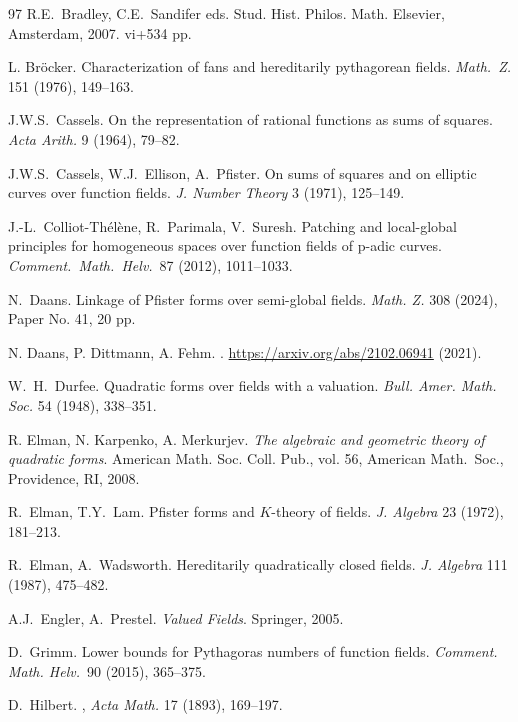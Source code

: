 \documentclass[12pt,leqno]{amsart}
\numberwithin{equation}{section}
\theoremstyle{definition}
\theoremstyle{plain}
\begin{document}
\begin{thebibliography}{97}
R.E.~Bradley, C.E.~Sandifer eds.
Stud. Hist. Philos. Math.
Elsevier, Amsterdam, 2007. vi+534 pp.

L. Br\"ocker.
\newblock Characterization of fans and hereditarily pythagorean fields.
\newblock \emph{Math.~Z.} 151 (1976), 149--163.

J.W.S.~Cassels.
On the representation of rational functions as sums of squares.
{\em Acta Arith.} 9 (1964), 79--82.

J.W.S.~Cassels, W.J.~Ellison, A.~Pfister.
\newblock On sums of squares and on elliptic curves over function fields.
{\em J. Number Theory} 3 (1971), 125--149.

J.-L.~Colliot-Th\'el\`ene, R.~Parimala, V.~Suresh.
\newblock Patching and local-global principles for homogeneous spaces over function fields of p-adic curves.
\emph{Comment.~Math.~Helv.}~87 (2012), 1011--1033. 

N.~Daans. Linkage of Pfister forms over semi-global fields.
\emph{Math. Z.} 308 (2024), Paper No. 41, 20 pp.

N. Daans, P. Dittmann, A. Fehm.
.
\newblock \url{https://arxiv.org/abs/2102.06941} (2021).

W.~H.~Durfee.
Quadratic forms over fields with a valuation.
{\em Bull. Amer. Math. Soc.} 54 (1948), 338--351.


R. Elman, N. Karpenko, A. Merkurjev. 
{\em The algebraic and geometric theory of quadratic forms}. 
American Math. Soc. Coll. Pub., vol. {56}, American Math.~Soc., Providence, RI, 2008.

R.~Elman, T.Y.~Lam.
Pfister forms and $K$-theory of fields. {\em J. Algebra} 23 (1972), 181--213.

R.~Elman, A.~Wadsworth. 
Hereditarily quadratically closed fields.
{\em J. Algebra} 111 (1987), 475--482.

 A.J.~Engler, A.~Prestel. \emph{Valued Fields}. Springer, 2005.

D.~Grimm. Lower bounds for Pythagoras numbers of function fields.
\emph{Comment. Math. Helv.}~90 (2015), 365--375.

D.~Hilbert. 
, 
\emph{Acta Math.} 17 (1893), 169--197.


\end{thebibliography}
\end{document}
